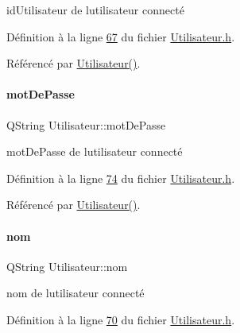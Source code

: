 id\+Utilisateur de l\textquotesingle{}utilisateur connecté 



Définition à la ligne \hyperlink{_utilisateur_8h_source_l00067}{67} du fichier \hyperlink{_utilisateur_8h_source}{Utilisateur.\+h}.



Référencé par \hyperlink{_utilisateur_8cpp_source_l00022}{Utilisateur()}.

\mbox{\label{class_utilisateur_a4f6a17d0fb5c231bcb414396236a056f}} 
\paragraph{\texorpdfstring{mot\+De\+Passe}{motDePasse}}
{\footnotesize\ttfamily Q\+String Utilisateur\+::mot\+De\+Passe\hspace{0.3cm}{\ttfamily [private]}}



mot\+De\+Passe de l\textquotesingle{}utilisateur connecté 



Définition à la ligne \hyperlink{_utilisateur_8h_source_l00074}{74} du fichier \hyperlink{_utilisateur_8h_source}{Utilisateur.\+h}.



Référencé par \hyperlink{_utilisateur_8cpp_source_l00022}{Utilisateur()}.

\mbox{\label{class_utilisateur_a1096e809aca4b7cf453a7af93cb72502}} 
\paragraph{\texorpdfstring{nom}{nom}}
{\footnotesize\ttfamily Q\+String Utilisateur\+::nom\hspace{0.3cm}{\ttfamily [private]}}



nom de l\textquotesingle{}utilisateur connecté 



Définition à la ligne \hyperlink{_utilisateur_8h_source_l00070}{70} du fichier \hyperlink{_utilisateur_8h_source}{Utilisateur.\+h}.



